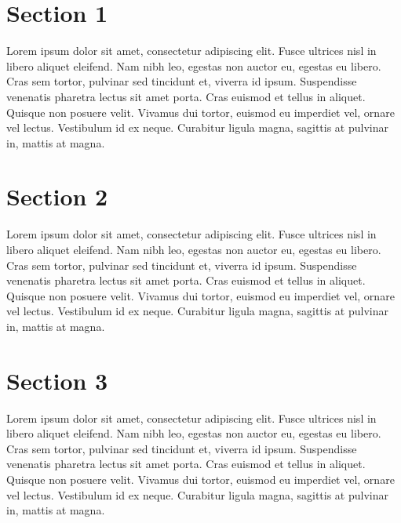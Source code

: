 \documentclass[a4paper, 12pt]{article}
\begin{document}


\tableofcontents
\newpage{\pagestyle{empty}}


\setcounter{page}{1}

\section{Section 1}
\label{section-1}

Lorem ipsum dolor sit amet, consectetur adipiscing elit. Fusce ultrices nisl in libero aliquet eleifend. Nam nibh leo, egestas non auctor eu, egestas eu libero. Cras sem tortor, pulvinar sed tincidunt et, viverra id ipsum. Suspendisse venenatis pharetra lectus sit amet porta. Cras euismod et tellus in aliquet. Quisque non posuere velit. Vivamus dui tortor, euismod eu imperdiet vel, ornare vel lectus. Vestibulum id ex neque. Curabitur ligula magna, sagittis at pulvinar in, mattis at magna.


\section{Section 2}
\label{section-2}

Lorem ipsum dolor sit amet, consectetur adipiscing elit. Fusce ultrices nisl in libero aliquet eleifend. Nam nibh leo, egestas non auctor eu, egestas eu libero. Cras sem tortor, pulvinar sed tincidunt et, viverra id ipsum. Suspendisse venenatis pharetra lectus sit amet porta. Cras euismod et tellus in aliquet. Quisque non posuere velit. Vivamus dui tortor, euismod eu imperdiet vel, ornare vel lectus. Vestibulum id ex neque. Curabitur ligula magna, sagittis at pulvinar in, mattis at magna.


\section{Section 3}
\label{section-3}

Lorem ipsum dolor sit amet, consectetur adipiscing elit. Fusce ultrices nisl in libero aliquet eleifend. Nam nibh leo, egestas non auctor eu, egestas eu libero. Cras sem tortor, pulvinar sed tincidunt et, viverra id ipsum. Suspendisse venenatis pharetra lectus sit amet porta. Cras euismod et tellus in aliquet. Quisque non posuere velit. Vivamus dui tortor, euismod eu imperdiet vel, ornare vel lectus. Vestibulum id ex neque. Curabitur ligula magna, sagittis at pulvinar in, mattis at magna.
\end{document}
